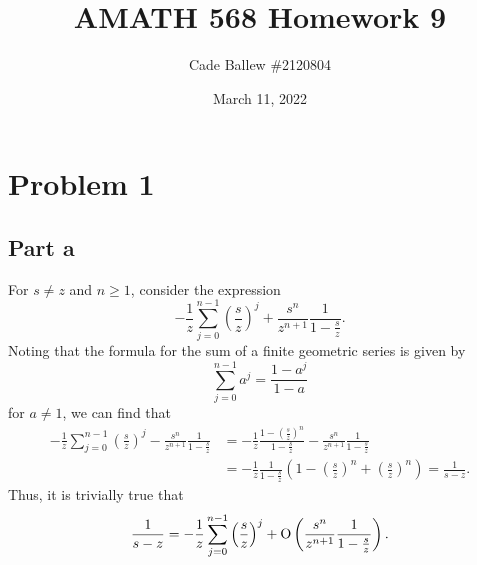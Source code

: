 \documentclass{article}
\title{AMATH 568 Homework 9}
\author{Cade Ballew \#2120804}
\date{March 11, 2022}
\begin{document}
	
\maketitle
	
\section{Problem 1}
\subsection{Part a}
For $s\neq z$ and $n\geq1$, consider the expression
\[
-\frac{1}{z}  \sum_{j=0}^{n-1} \left( \frac{s}{z} \right)^j + \frac{s^n}{z^{n+1}} \frac{1}{1-\frac s z}.
\]
Noting that the formula for the sum of a finite geometric series is given by 
\[
\sum_{j=0}^{n-1} a^j=\frac{1-a^j}{1-a}
\]
for $a\neq1$, we can find that 
\begin{align*}
-\frac{1}{z}  \sum_{j=0}^{n-1} \left( \frac{s}{z} \right)^j - \frac{s^n}{z^{n+1}} \frac{1}{1-\frac s z}&=-\frac{1}{z}\frac{1-\left( \frac{s}{z} \right)^n}{1-\frac{s}{z}}- \frac{s^n}{z^{n+1}} \frac{1}{1-\frac s z}\\&=-\frac{1}{z}\frac{1}{1-\frac s z} \left(1-\left( \frac{s}{z} \right)^n+\left( \frac{s}{z} \right)^n\right)=\frac{1}{s-z}.
\end{align*}
Thus, it is trivially true that 
\[
\frac{1}{s-z} = -\frac{1}{z}  \sum_{j=0}^{n-1} \left( \frac{s}{z} \right)^j + \operatorname{O}\left(\frac{s^n}{z^{n+1}} \frac{1}{1-\frac s z}\right).
\]
\end{document}
